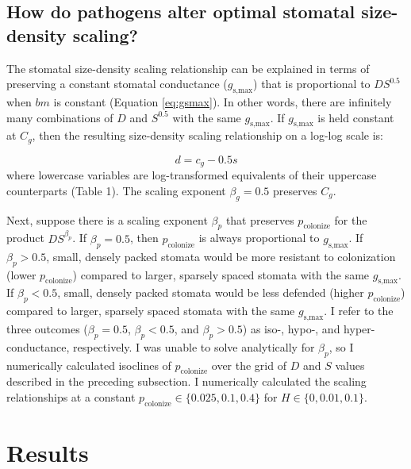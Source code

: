 \documentclass[utf8]{frontiersSCNS}
\newcommand{\gsmax}{$g_\text{s,max}$}
\begin{document}
\hypertarget{how-do-pathogens-alter-optimal-stomatal-size-density-scaling}{%
\subsection*{How do pathogens alter optimal stomatal size-density
scaling?}\label{how-do-pathogens-alter-optimal-stomatal-size-density-scaling}}

The stomatal size-density scaling relationship can be explained in terms
of preserving a constant stomatal conductance (\gsmax) that is
proportional to \(D S ^ {0.5}\) when \(bm\) is constant (Equation
\ref{eq:gsmax}). In other words, there are infinitely many combinations
of \(D\) and \(S ^ {0.5}\) with the same \gsmax. If \gsmax{} is held
constant at \(C_g\), then the resulting size-density scaling
relationship on a log-log scale is:

\[ d = c_g - 0.5 s \] where lowercase variables are log-transformed
equivalents of their uppercase counterparts (Table 1). The scaling
exponent \(\beta_g = 0.5\) preserves \(C_g\).

Next, suppose there is a scaling exponent \(\beta_p\) that preserves
\(p_\text{colonize}\) for the product \(D S^{\beta_p}\). If
\(\beta_p = 0.5\), then \(p_\text{colonize}\) is always proportional to
\gsmax. If \(\beta_p > 0.5\), small, densely packed stomata would be
more resistant to colonization (lower \(p_\text{colonize}\)) compared to
larger, sparsely spaced stomata with the same \gsmax. If
\(\beta_p < 0.5\), small, densely packed stomata would be less defended
(higher \(p_\text{colonize}\)) compared to larger, sparsely spaced
stomata with the same \gsmax. I refer to the three outcomes
(\(\beta_p = 0.5\), \(\beta_p < 0.5\), and \(\beta_p > 0.5\)) as iso-,
hypo-, and hyper-conductance, respectively. I was unable to solve
analytically for \(\beta_p\), so I numerically calculated isoclines of
\(p_\text{colonize}\) over the grid of \(D\) and \(S\) values described
in the preceding subsection. I numerically calculated the scaling
relationships at a constant
\(p_\text{colonize} \in \{0.025, 0.1, 0.4\}\) for
\(H \in \{0, 0.01, 0.1\}\).

\hypertarget{results}{%
\section*{Results}\label{results}}
\end{document}

